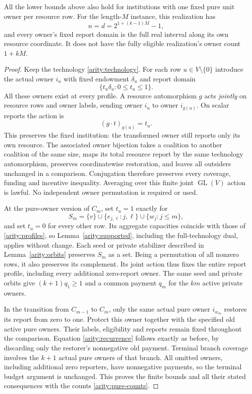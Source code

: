 \begin{corollary}
\label{arity:pure}
All the lower bounds above also hold for institutions with one fixed pure
unit owner per resource row.  For the length-$M$ instance, this realization
has
\begin{equation}
  n=d=2^{1+(k-1)M}-1,
  \label{arity:pure-counts}
\end{equation}
and every owner's fixed report domain is the full real interval along its
own resource coordinate.  It does not have the fully eligible realization's
owner count $1+kM$.
\end{corollary}

\begin{proof}
Keep the technology \eqref{arity:technology}.  For each row
$u\in V\setminus\{0\}$ introduce the actual owner $i_u$ with fixed
endowment $\delta_u$ and report domain
\[
  \{t_u\delta_u:0\leq t_u\leq1\}.
\]
All these owners exist at every profile.  A resource automorphism $g$ acts
\emph{jointly} on resource rows and owner labels, sending owner $i_u$ to
owner $i_{g(u)}$.  On scalar reports the action is
\[
  (g\cdot t)_{g(u)}=t_u.
\]
This preserves the fixed institution: the transformed owner still reports
only its own resource.  The associated owner bijection takes a coalition
to another coalition of the same size, maps its total resource report by
the same technology automorphism, preserves coordinatewise restoration,
and leaves all outsiders unchanged in a comparison.  Conjugation therefore
preserves every coverage, funding and incentive inequality.  Averaging over
this finite joint $\operatorname{GL}(V)$ action is lawful.  No independent
owner permutation is required or used.

At the pure-owner version of $C_m$, set $t_u=1$ exactly for
\[
  S_m=\{v\}\cup\{e_{j,\ell}:j,\ell\}
                 \cup\{w_j:j\leq m\},
\]
and set $t_u=0$ for every other row.  Its aggregate capacities coincide with
those of \eqref{arity:profiles}, so Lemma~\ref{arity:supported}, including
the full-technology dual, applies without change.  Each seed or private
stabilizer described in Lemma~\ref{arity:orbits} preserves $S_m$ as a set.
Being a permutation of all nonzero rows, it also preserves its complement.
Its joint action thus fixes the entire report profile, including every
additional zero-report owner.  The same seed and private orbits give
$(k+1)q_1\geq1$ and a common payment $q_m$ for the $km$ active private owners.

In the transition from $C_{m-1}$ to $C_m$, only the same actual pure owner
$i_{w_m}$ restores its report from zero to one.  Protect this owner together
with the specified old active pure owners.  Their labels, eligibility and
reports remain fixed throughout the comparison.  Equation
\eqref{arity:recurrence} follows exactly as before, by discarding only the
restorer's nonnegative old payment.  Terminal branch coverage involves
the $k+1$ actual pure owners of that branch.  All omitted owners, including
additional zero reporters, have nonnegative payments, so the terminal
budget argument is unchanged.  This proves the finite bounds and all their
stated consequences with the counts \eqref{arity:pure-counts}.
\end{proof}

